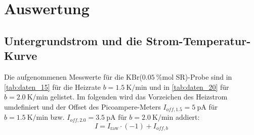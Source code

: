 \section{Auswertung}
\label{sec:Auswertung}

\subsection{Untergrundstrom und die Strom-Temperatur-Kurve}
Die aufgenommenen Messwerte für die KBr($\SI{0.05}{\percent \mole}$ SR)-Probe sind in \autoref{tab:daten_15} für die Heizrate $b = \SI{1.5}{\kelvin \per \minute}$ und in \autoref{tab:daten_20} für $b = \SI{2.0}{\kelvin \per \minute}$ gelistet.
Im folgenden wird das Vorzeichen des Heizstrom umdefiniert und der Offset des Picoampere-Meters $I_{off, 1.5} = \SI{5}{\pico\ampere}$ für $b = \SI{1.5}{\kelvin \per \minute}$ bzw. $I_{off, 2.0} = \SI{3.5}{\pico\ampere}$ für $b = \SI{2.0}{\kelvin \per \minute}$ addiert:
\begin{equation*}
    I = I_\text{raw} \cdot (-1) + I_{off, b}
\end{equation*}
